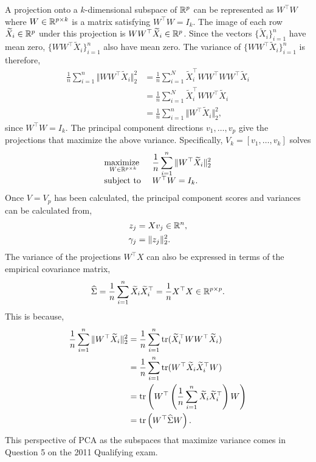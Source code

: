 A projection onto a $k$-dimensional subspace of $\mathbb{R}^p$ can be represented as $W^\top W$ where $W \in \mathbb{R}^{p \times k}$ is a matrix satisfying $W^\top W = I_k$. The image of each row $\widetilde{X}_i \in \mathbb{R}^p$ under this projection is $WW^\top \widetilde{X}_i \in \mathbb{R}^p$. Since the vectors $\{\widetilde{X}_i\}_{i=1}^n$ have mean zero, $\{WW^\top \widetilde{X}_i\}_{i=1}^n$ also have mean zero. The variance of $\{WW^\top \widetilde{X}_i\}_{i=1}^n$ is therefore,
\begin{align}
    \frac{1}{n}\sum_{i=1}^n \Vert WW^\top \widetilde{X}_i \Vert_2^2 &= \frac{1}{n}\sum_{i=1}^N \widetilde{X}_i^\top WW^\top WW^\top \widetilde{X}_i \nonumber \\
    &=\frac{1}{n}\sum_{i=1}^N \widetilde{X}_i^\top WW^\top \widetilde{X}_i\nonumber \\
    &=\frac{1}{n}\sum_{i=1}^n \Vert W^\top \widetilde{X}_i\Vert_2^2\label{eq:variance},
\end{align} 
since $W^\top W = I_k$. The principal component directions $v_1,\ldots,v_p$ give the projections that maximize the above variance. Specifically, $V_k = [v_1,\ldots,v_k]$ solves
\[\begin{array}{ll}
    \underset{W \in \mathbb{R}^{p \times k}}{\mbox{maximize }} &\displaystyle{\frac{1}{n}\sum_{i=1}^n \Vert W^\top \widetilde{X}_i \Vert_2^2}\\
    \mbox{subject to }& W^\top W = I_k.
\end{array} \]
Once $V=V_p$ has been calculated, the principal component scores and variances can be calculated from,
\begin{align*}
    z_j &=Xv_j \in \mathbb{R}^n,\\
    \gamma_j &=\Vert z_j\Vert_2^2.
\end{align*}
The variance of the projections $W^\top X$ can also be expressed in terms of the empirical covariance matrix,
\[\widehat{\Sigma} = \frac{1}{n}\sum_{i=1}^n \widetilde{X}_i\widetilde{X}_i^\top = \frac{1}{n}X^\top X \in \mathbb{R}^{p \times p}. \]
This is because,
\begin{align*}
    \frac{1}{n}\sum_{i=1}^n \Vert W^\top \widetilde{X}_i\Vert_2^2&=\frac{1}{n}\sum_{i=1}^n \operatorname{tr}(\widetilde{X}_i^\top W W^\top \widetilde{X}_i)\\
    &=\frac{1}{n}\sum_{i=1}^n \operatorname{tr}(W^\top \widetilde{X}_i\widetilde{X}_i^\top W)\\
    &=\operatorname{tr}\left(W^\top \left(\frac{1}{n}\sum_{i=1}^n \widetilde{X}_i\widetilde{X}_i^\top\right)W\right)\\
    &=\operatorname{tr}\left(W^\top \widehat{\Sigma}W\right).
\end{align*}
This perspective of PCA as the subspaces that maximize variance comes in Question 5 on the 2011 Qualifying exam. 

